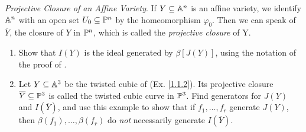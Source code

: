 \label{1.2.9}

\textit{Projective Closure of an Affine Variety}. If $Y \subseteq \A^n$ is an affine variety, we identify $\A^n$ with an open set $U_0 \subseteq \P^n$ by the homeomorphism $\varphi_0$. Then we can speak of $\overline{Y}$, the closure of $Y$ in $\P^n$, which is called the \textit{projective closure} of Y.

\begin{enumerate}[label = (\alph*)]
    \item Show that $I(Y)$ is the ideal generated by $\beta[J(Y)]$, using the notation of the proof of \cite[2.2]{hartshorne}.
    
    \item Let $Y \subseteq \A^3$ be the twisted cubic of (Ex. \ref{1.1.2}). Its projective closure $\overline{Y} \subseteq \P^3$ is called the twisted cubic curve in $\P^3$. Find generators for $J(Y)$ and $I(\overline Y)$, and use this example to show that if $f_1, \dots, f_r$ generate $J(Y)$, then $\beta(f_1), \dots, \beta(f_r)$ do \textit{not} necessarily generate $I(\overline{Y})$.
\end{enumerate}

